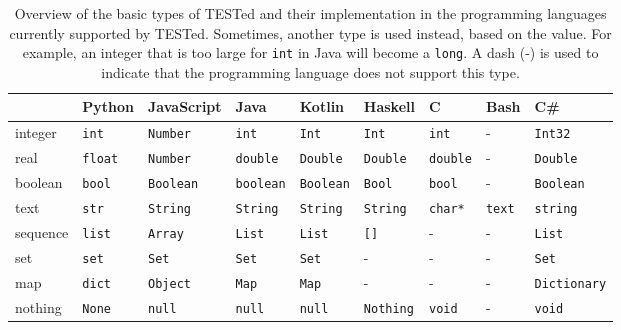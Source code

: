 \documentclass[../main]{subfiles}
\begin{document}
\begin{table}
    \caption{
        Overview of the basic types of TESTed and their implementation in the programming languages currently supported by TESTed.
        Sometimes, another type is used instead, based on the value. For example, an integer that is too large for \texttt{int} in Java will become a \texttt{long}.
        A dash (-) is used to indicate that the programming language does not support this type.
    }
    \label{tab:tested-basic-types}
    \begin{wide}
        \small\setlength{\tabcolsep}{0.5\tabcolsep}%
        \begin{tabular}{|l|l|l|l|l|l|l|l|l|}
            \hline
            \tested{} & Python         & JavaScript       & Java             & Kotlin           & Haskell          & C               & Bash          & C\#                 \\
            \hline
            integer   & \texttt{int}   & \texttt{Number}  & \texttt{int}     & \texttt{Int}     & \texttt{Int}     & \texttt{int}    & -             & \texttt{Int32}      \\
            real      & \texttt{float} & \texttt{Number}  & \texttt{double}  & \texttt{Double}  & \texttt{Double}  & \texttt{double} & -             & \texttt{Double}     \\
            boolean   & \texttt{bool}  & \texttt{Boolean} & \texttt{boolean} & \texttt{Boolean} & \texttt{Bool}    & \texttt{bool}   & -             & \texttt{Boolean}    \\
            text      & \texttt{str}   & \texttt{String}  & \texttt{String}  & \texttt{String}  & \texttt{String}  & \texttt{char*}  & \texttt{text} & \texttt{string}     \\
            sequence  & \texttt{list}  & \texttt{Array}   & \texttt{List}    & \texttt{List}    & \texttt{{[}{]}}  & -               & -             & \texttt{List}       \\
            set       & \texttt{set}   & \texttt{Set}     & \texttt{Set}     & \texttt{Set}     & -                & -               & -             & \texttt{Set}        \\
            map       & \texttt{dict}  & \texttt{Object}  & \texttt{Map}     & \texttt{Map}     & -                & -               & -             & \texttt{Dictionary} \\
            nothing   & \texttt{None}  & \texttt{null}    & \texttt{null}    & \texttt{null}    & \texttt{Nothing} & \texttt{void}   & -             & \texttt{void}       \\
            \hline
        \end{tabular}
    \end{wide}
\end{table}
\end{document}
